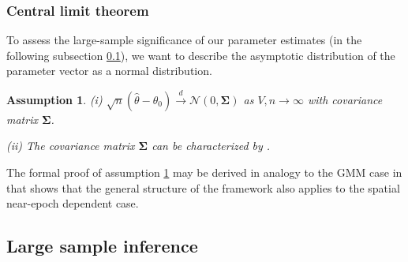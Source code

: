 \documentclass[12pt]{article}
\newtheorem{assume}{Assumption}
\begin{document}
\subsubsection{Central limit theorem}
To assess the large-sample significance of our parameter estimates (in the following subsection \ref{sec:asymptotic_inference}), we want to describe the asymptotic distribution of the parameter vector as a normal distribution.

\begin{assume}
	\label{as:clt}
	(i) $\sqrt{n}(\hat{\theta} - \theta_0) \overset{d}{\to} \mathcal{N}(0,\mathbf{\Sigma})$ as $V,n \to \infty$ with covariance matrix $\mathbf{\Sigma}$.
	
	(ii) The covariance matrix $\mathbf{\Sigma}$ can be characterized by \citet[Theorem 11.2.b, Theorem H.1]{PP97}.
\end{assume}

The formal proof of assumption \ref{as:clt} may be derived in analogy to the GMM case in \cite[Theorem 4]{JP12} that shows that the general structure of the \cite{PP97} framework also applies to the spatial near-epoch dependent case.



\subsection{Large sample inference}
\label{sec:asymptotic_inference}
\end{document}
